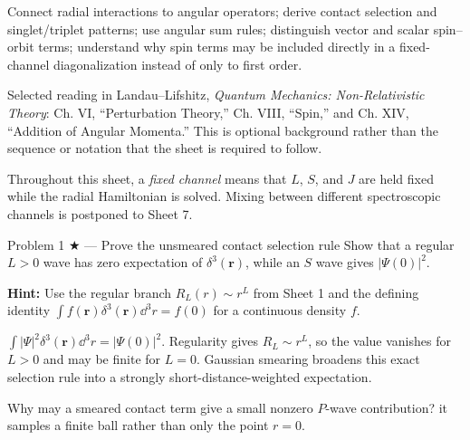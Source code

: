 \documentclass[11pt]{article}
\begin{document}

\begin{goals}
Connect radial interactions to angular operators; derive contact selection and
singlet/triplet patterns; use angular sum rules; distinguish vector and scalar
spin--orbit terms; understand why spin terms may be included directly in a
fixed-channel diagonalization instead of only to first order.
\end{goals}
\begin{reading}
Selected reading in Landau--Lifshitz, \emph{Quantum Mechanics: Non-Relativistic
Theory}: Ch. VI, ``Perturbation Theory,'' Ch. VIII, ``Spin,'' and Ch. XIV,
``Addition of Angular Momenta.'' This is optional background rather than the
sequence or notation that the sheet is required to follow.
\end{reading}


Throughout this sheet, a \emph{fixed channel} means that $L$, $S$, and $J$ are
held fixed while the radial Hamiltonian is solved. Mixing between different
spectroscopic channels is postponed to Sheet 7.

\begin{problem}{Problem 1 ★ — Prove the unsmeared contact selection rule}
Show that a regular $L>0$ wave has zero expectation of $\delta^3(\bm r)$, while
an $S$ wave gives $|\Psi(0)|^2$.

\textbf{Hint:} Use the regular branch $R_L(r)\sim r^L$ from Sheet 1 and
the defining identity $\int f(\bm r)\delta^3(\bm r)\dd^3r=f(0)$
for a continuous density $f$.
\end{problem}
\begin{solution}
$\int|\Psi|^2\delta^3(\bm r)\dd^3r=|\Psi(0)|^2$. Regularity gives
$R_L\sim r^L$, so the value vanishes for $L>0$ and may be finite for $L=0$.
Gaussian smearing broadens this exact selection rule into a strongly
short-distance-weighted expectation.
\end{solution}
\begin{quiz}
Why may a smeared contact term give a small nonzero $P$-wave contribution?
\answer it samples a finite ball rather than only the point $r=0$.
\end{quiz}
\end{document}
